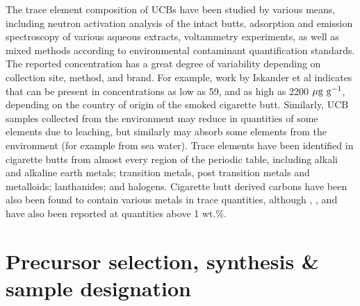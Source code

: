 The trace element composition of UCBs have been studied by various means, including neutron activation analysis of the intact butts,\citep{iskander1992multielement, Iskander1985, jenkins1985neutron, Wu1997} adsorption and emission spectroscopy of various aqueous extracts,\citep{MussaloRauhamaa1986, Kazi2009, Moriwaki2009, Moerman2011, Pelit2013, Dobaradaran2018} voltammetry experiments,\citep{Nitsch1991, Kalcher1993} as well as mixed methods according to environmental contaminant quantification standards.\citep{cardoso2018exposure} The reported concentration has a great degree of variability depending on collection site, method, and brand. For example, work by Iskander et al indicates that  can be present in concentrations as low as 59, and as high as 2200 $\rm{\mu g\ g^{-1}}$, depending on the country of origin of the smoked cigarette butt. Similarly, UCB samples collected from the environment\citep{Dobaradaran2017, Moriwaki2009, Moerman2011, chevalier2018nano} may reduce in quantities of some elements due to leaching, but similarly may absorb some elements from the environment (for example from sea water). Trace elements have been identified in cigarette butts from almost every region of the periodic table, including alkali and alkaline earth metals;\cite{MussaloRauhamaa1986, Iskander1985, iskander1992multielement, jenkins1985neutron, Wu1997, cardoso2018exposure}  transition metals, post transition metals and metalloids;\citep{MussaloRauhamaa1986, Dobaradaran2017, Iskander1985, jenkins1985neutron, Wu1997, Moriwaki2009, Moerman2011, Pelit2013, Dobaradaran2018, Ren2017, cardoso2018exposure, chevalier2018nano} lanthanides;\citep{iskander1992multielement} and halogens.\citep{Iskander1985, iskander1992multielement, jenkins1985neutron, Wu1997} Cigarette butt derived carbons have been also been found to contain various metals in trace quantities,\citep{Soltani, Soltani2013, Yazdi2012} although , , and  have also been reported at quantities above 1 wt.\%.\citep{Soltani, Soltani2013, Yazdi2012, Lima2018}

\section{Precursor selection, synthesis \& sample designation}

